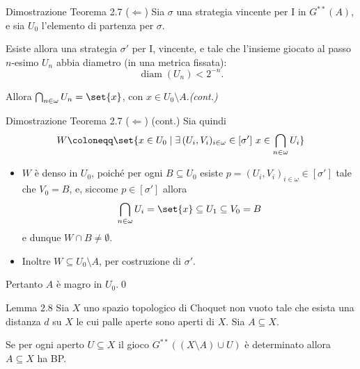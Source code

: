 \documentclass[babel]{beamer}
\renewcommand{\href}[2]{#2}
\begin{document}
\begin{frame}[label={sec:org7e23e96}]{Dimostrazione Teorema 2.7 (\(\Leftarrow\))}
Sia \(\sigma\) una strategia vincente per I in \(G^{**}(A)\), e sia \(U_{0}\) l'elemento di partenza per \(\sigma\).

Esiste allora una strategia \(\sigma'\) per I, vincente, e tale che l'insieme giocato al passo \(n\)-esimo \(U_{n}\) abbia diametro (in una metrica fissata):
\begin{equation*}
\operatorname{diam}(U_{n})<2^{-n}.
\end{equation*}

Allora \(\bigcap_{n \in \omega} U_{n} = \set{x}\), con \(x \in U_{0}\setminus A\).\hfill \textit{(cont.)}
\end{frame}
\begin{frame}[label={sec:orga29e24b}]{Dimostrazione Teorema 2.7 (\(\Leftarrow\)) (cont.)}
Sia quindi
\begin{equation*}
W\coloneqq \set{x \in U_{0}\mid
\exists\, (U_{i}, V_{i})_{i \in \omega} \in [\sigma']\ x \in \bigcap_{n \in \omega} U_{i}}
\end{equation*}
\begin{itemize}
\item \(W\) è denso in \(U_{0}\), poiché per ogni \(B \subseteq U_{0}\) esiste \(p = (U_{i}, V_{i})_{i \in \omega} \in [\sigma']\) tale che \(V_{0} = B\), e, siccome \(p \in [\sigma']\) allora
\begin{equation*}
  \bigcap_{n \in \omega} U_{i} = \set{x} \subseteq U_{1} \subseteq V_{0} = B
\end{equation*}
e dunque \(W\cap B\neq \emptyset\).
\item Inoltre \(W \subseteq U_{0}\setminus A\), per costruzione di \(\sigma'\).
\end{itemize}

Pertanto \(A\) è magro in \(U_{0}\).\qed
\end{frame}
\begin{frame}[label={sec:org6bb6658}]
\begin{alertblock}{Lemma 2.8}
Sia \(X\) uno \href{../../../../../../../org/roam/20250103145124-topologia.org}{spazio topologico} \href{../../../../../../../org/roam/20250514174255-gioco_di_choquet.org}{di Choquet} non \href{../../../../../../../org/roam/20250131161811-insieme_vuoto_mk.org}{vuoto} tale che esista una \href{../../../../../../../org/roam/20250301193511-spazio_metrico.org}{distanza} \(d\) su \(X\) le cui \href{../../../../../../../org/roam/20250301193511-spazio_metrico.org}{palle aperte} sono aperti di \(X\). Sia \(A \subseteq X\).

Se per ogni aperto \(U \subseteq X\) il \href{../../../../../../../org/roam/20250513111844-gioco_di_banach_mazur.org}{gioco} \(G^{**}\left((X\setminus A)\cup U\right)\) è \href{../../../../../../../org/roam/20250513155732-logic_game.org}{determinato} allora \(A \subseteq X\) ha \href{../../../../../../../org/roam/20250514154039-proprieta_di_baire.org}{BP}.
\end{alertblock}
\end{frame}
\end{document}
